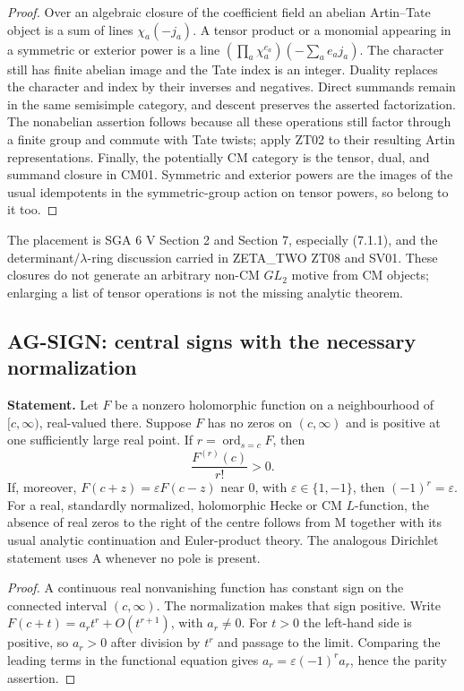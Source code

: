 \begin{proof}
Over an algebraic closure of the coefficient field an abelian Artin--Tate
object is a sum of lines $\chi_a(-j_a)$. A tensor product or a monomial
appearing in a symmetric or exterior power is a line
$(\prod_a\chi_a^{e_a})(-\sum_a e_aj_a)$. The character still has finite
abelian image and the Tate index is an integer. Duality replaces the
character and index by their inverses and negatives. Direct summands remain
in the same semisimple category, and descent preserves the asserted
factorization. The nonabelian assertion follows because all these
operations still factor through a finite group and commute with Tate
twists; apply ZT02 to their resulting Artin representations. Finally, the
potentially CM category is the tensor, dual, and summand closure in CM01.
Symmetric and exterior powers are the images of the usual idempotents in
the symmetric-group action on tensor powers, so belong to it too.
\end{proof}

The placement is SGA 6 V Section 2 and Section 7, especially (7.1.1),
and the determinant/$\lambda$-ring discussion carried in ZETA\_TWO ZT08
and SV01. These closures do not generate an arbitrary non-CM $GL_2$
motive from CM objects; enlarging a list of tensor operations is not the
missing analytic theorem.

\subsection{AG-SIGN: central signs with the necessary normalization}
\label{ag:sign}

\textbf{Statement.} Let $F$ be a nonzero holomorphic function on a
neighbourhood of $[c,\infty)$, real-valued there. Suppose $F$ has no zeros
on $(c,\infty)$ and is positive at one sufficiently large real point.
If $r=\operatorname{ord}_{s=c}F$, then
\[
 \frac{F^{(r)}(c)}{r!}>0.
\]
If, moreover, $F(c+z)=\varepsilon F(c-z)$ near $0$, with
$\varepsilon\in\{1,-1\}$, then $(-1)^r=\varepsilon$.
For a real, standardly normalized, holomorphic Hecke or CM $L$-function,
the absence of real zeros to the right of the centre follows from M
together with its usual analytic continuation and Euler-product theory.
The analogous Dirichlet statement uses A whenever no pole is present.

\begin{proof}
A continuous real nonvanishing function has constant sign on the connected
interval $(c,\infty)$. The normalization makes that sign positive.
Write $F(c+t)=a_rt^r+O(t^{r+1})$, with $a_r\ne0$. For $t>0$ the
left-hand side is positive, so $a_r>0$ after division by $t^r$ and passage
to the limit. Comparing the leading terms in the functional equation gives
$a_r=\varepsilon(-1)^r a_r$, hence the parity assertion.
\end{proof}

